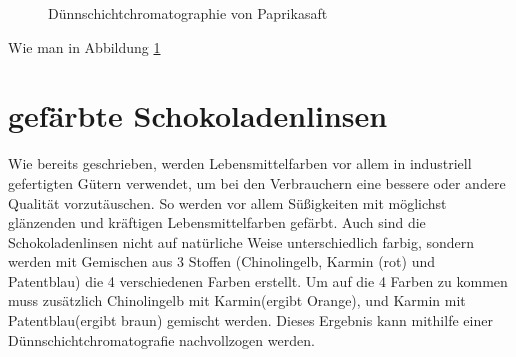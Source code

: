 \documentclass[11pt]{scrreprt}
\begin{document}
\begin{figure}[ht!]
\centering
{}
	\caption{Dünnschichtchromatographie von Paprikasaft}
	\label{img:paprika}
\end{figure}


Wie man in Abbildung \ref{img:paprika}
\section{gefärbte Schokoladenlinsen}
Wie bereits geschrieben, werden Lebensmittelfarben vor allem in industriell gefertigten Gütern verwendet, um bei den Verbrauchern eine bessere oder andere Qualität vorzutäuschen. So werden vor allem Süßigkeiten mit möglichst glänzenden und kräftigen Lebensmittelfarben gefärbt. Auch sind die Schokoladenlinsen nicht auf natürliche Weise unterschiedlich farbig, sondern werden mit Gemischen aus 3 Stoffen (Chinolingelb, Karmin (rot) und Patentblau) die 4 verschiedenen Farben erstellt. Um auf die 4 Farben zu kommen muss zusätzlich Chinolingelb mit Karmin(ergibt Orange), und Karmin mit Patentblau(ergibt braun) gemischt werden.
Dieses Ergebnis kann mithilfe einer Dünnschichtchromatografie nachvollzogen werden.
\end{document}
